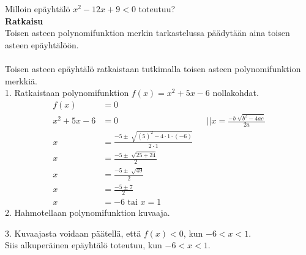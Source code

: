 \begin{esimerkki} 
Milloin epäyhtälö $x^2-12x+9<0$ toteutuu? \\ 
\textbf{Ratkaisu} \\
Toisen asteen polynomifunktion merkin tarkastelussa päädytään aina toisen asteen epäyhtälöön. \\ \\
Toisen asteen epäyhtälö ratkaistaan tutkimalla toisen asteen polynomifunktion merkkiä.  \\
1. Ratkaistaan polynomifunktion $f(x)=x^2+5x-6$ nollakohdat.
\begin{align*}
f(x)&=0 \\
x^2+5x-6&=0 \ \  \ \ \ &&||x=\frac{-b \sqrt[]{b^2-4ac}}{2a} \\ 
x&=\frac{-5 \pm \sqrt[]{(5)^2-4 \cdot 1 \cdot(-6)}}{2 \cdot 1} \\
x&=\frac{-5 \pm \sqrt[]{25+24}}{2} \\
x&=\frac{-5 \pm \sqrt[]{49}}{2} \\
x&=\frac{-5 \pm 7}{2} \\
x&=-6 \text{ tai } x=1
\end{align*}
2. Hahmotellaan polynomifunktion kuvaaja. \\ 

\begin{lukusuora}{-2.5}{2.5}{5}
\end{lukusuora}

3.  Kuvaajasta voidaan päätellä, että $f(x)<0$, kun $-6 < x < 1$.  \\
Siis alkuperäinen epäyhtälö toteutuu, kun $-6 < x <1$.  
\end{esimerkki}
